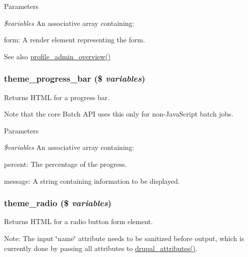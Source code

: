 \begin{DoxyParams}{Parameters}
\item[{\em \$variables}]An associative array containing:
\begin{DoxyItemize}
\item form: A render element representing the form.
\end{DoxyItemize}\end{DoxyParams}
\begin{DoxySeeAlso}{See also}
\hyperlink{group__forms_gafea18af3496251513291ed1ddc563fcc}{profile\_\-admin\_\-overview()} 
\end{DoxySeeAlso}
\hypertarget{group__themeable_ga9892ce57f458f8e372fb04b7a05bbc73}{
\subsubsection[{theme\_\-progress\_\-bar}]{\setlength{\rightskip}{0pt plus 5cm}theme\_\-progress\_\-bar (\$ {\em variables})}}
\label{group__themeable_ga9892ce57f458f8e372fb04b7a05bbc73}
Returns HTML for a progress bar.

Note that the core Batch API uses this only for non-\/JavaScript batch jobs.


\begin{DoxyParams}{Parameters}
\item[{\em \$variables}]An associative array containing:
\begin{DoxyItemize}
\item percent: The percentage of the progress.
\item message: A string containing information to be displayed. 
\end{DoxyItemize}\end{DoxyParams}
\hypertarget{group__themeable_ga1cb9f23d9d87c9189591becc9a456907}{
\subsubsection[{theme\_\-radio}]{\setlength{\rightskip}{0pt plus 5cm}theme\_\-radio (\$ {\em variables})}}
\label{group__themeable_ga1cb9f23d9d87c9189591becc9a456907}
Returns HTML for a radio button form element.

Note: The input \char`\"{}name\char`\"{} attribute needs to be sanitized before output, which is currently done by passing all attributes to \hyperlink{group__sanitization_gacf11629fb3d1ebf200863e2d15380b4a}{drupal\_\-attributes()}.


